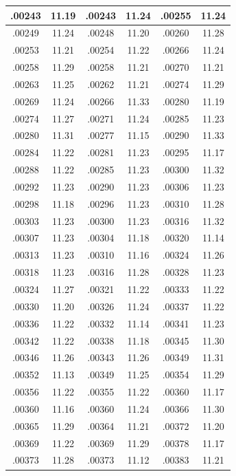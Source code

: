 \documentclass[10pt,twoside]{report}
\begin{document}
\begin{appendices}
\begin{longtable}{|c|c||c|c||c|c|}
.00243 & 11.19 & .00243 & 11.24 & .00255 & 11.24\\\hline
.00249 & 11.24 & .00248 & 11.20 & .00260 & 11.28\\\hline
.00253 & 11.21 & .00254 & 11.22 & .00266 & 11.24\\\hline
.00258 & 11.29 & .00258 & 11.21 & .00270 & 11.21\\\hline
.00263 & 11.25 & .00262 & 11.21 & .00274 & 11.29\\\hline
.00269 & 11.24 & .00266 & 11.33 & .00280 & 11.19\\\hline
.00274 & 11.27 & .00271 & 11.24 & .00285 & 11.23\\\hline
.00280 & 11.31 & .00277 & 11.15 & .00290 & 11.33\\\hline
.00284 & 11.22 & .00281 & 11.23 & .00295 & 11.17\\\hline
.00288 & 11.22 & .00285 & 11.23 & .00300 & 11.32\\\hline
.00292 & 11.23 & .00290 & 11.23 & .00306 & 11.23\\\hline
.00298 & 11.18 & .00296 & 11.23 & .00310 & 11.28\\\hline
.00303 & 11.23 & .00300 & 11.23 & .00316 & 11.32\\\hline
.00307 & 11.23 & .00304 & 11.18 & .00320 & 11.14\\\hline
.00313 & 11.23 & .00310 & 11.16 & .00324 & 11.26\\\hline
.00318 & 11.23 & .00316 & 11.28 & .00328 & 11.23\\\hline
.00324 & 11.27 & .00321 & 11.22 & .00333 & 11.22\\\hline
.00330 & 11.20 & .00326 & 11.24 & .00337 & 11.22\\\hline
.00336 & 11.22 & .00332 & 11.14 & .00341 & 11.23\\\hline
.00342 & 11.22 & .00338 & 11.18 & .00345 & 11.30\\\hline
.00346 & 11.26 & .00343 & 11.26 & .00349 & 11.31\\\hline
.00352 & 11.13 & .00349 & 11.25 & .00354 & 11.29\\\hline
.00356 & 11.22 & .00355 & 11.22 & .00360 & 11.17\\\hline
.00360 & 11.16 & .00360 & 11.24 & .00366 & 11.30\\\hline
.00365 & 11.29 & .00364 & 11.21 & .00372 & 11.20\\\hline
.00369 & 11.22 & .00369 & 11.29 & .00378 & 11.17\\\hline
.00373 & 11.28 & .00373 & 11.12 & .00383 & 11.21\\\hline

\end{longtable}
\end{appendices}
\end{document}
